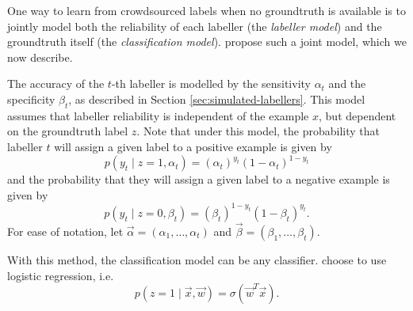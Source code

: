         One way to learn from crowdsourced labels when no groundtruth is
        available is to jointly model both the reliability of each labeller (the
        \emph{labeller model}) and the groundtruth itself (the
        \emph{classification model}). \citet{raykar10} propose such a joint
        model, which we now describe.

        The accuracy of the $t$-th labeller is modelled by the sensitivity
        $\alpha_t$ and the specificity $\beta_t$, as described in Section
        \ref{sec:simulated-labellers}. This model assumes that labeller
        reliability is independent of the example $x$, but dependent on the
        groundtruth label $z$. Note that under this model, the probability that
        labeller $t$ will assign a given label to a positive example is given by
        \begin{equation*}
            p(y_t \mid z = 1, \alpha_t) =
                (\alpha_t)^{y_t} (1 - \alpha_t)^{1 - y_t}
        \end{equation*}
        and the probability that they will assign a given label to a negative
        example is given by
        \begin{equation*}
            p(y_t \mid z = 0, \beta_t) =
                (\beta_t)^{1 - y_t} (1 - \beta_t)^{y_t}.
        \end{equation*}
        For ease of notation, let $\vec \alpha = (\alpha_1, \dots, \alpha_t)$
        and $\vec \beta = (\beta_1, \dots, \beta_t)$.

        With this method, the classification model can be any classifier.
        \citeauthor{raykar10} choose to use logistic regression, i.e.
        \begin{equation}
            \label{eq:raykar-logreg}
            p(z = 1 \mid \vec x, \vec w) = \sigma(\vec w^T \vec x).
        \end{equation}

